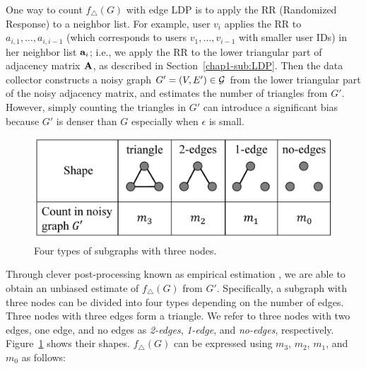 One way to count $f_\triangle(G)$ with edge LDP is 
to apply the RR (Randomized Response) 
to a neighbor list. 
For example, user $v_i$ applies the RR to 
$a_{i,1}, \ldots, a_{i,i-1}$ (which corresponds to users $v_1, \ldots, v_{i-1}$ with smaller user IDs) in her neighbor list $\mathbf{a}_i$; i.e., 
we apply the RR to the lower triangular part of adjacency matrix $\mathbf{A}$, as described in Section~\ref{chap1-sub:LDP}. 
Then the data collector constructs a noisy graph $G'=(V,E') \in \mathcal{G}$ from the lower triangular part of the noisy adjacency matrix, and 
estimates the number of triangles 
from $G'$. 
However, 
simply counting
the triangles in 
$G'$ 
can introduce a significant bias 
because $G'$ is denser than $G$ especially when $\epsilon$ is small. 

\begin{figure}
\centering
\includegraphics[width=0.9\linewidth]{fig/triplet_shape.pdf}
\vspace{-4mm}
\caption{Four types of subgraphs with three nodes.}
\label{chap1-fig:triplet_shape}
\end{figure}

Through 
clever post-processing 
known as 
empirical estimation 
\cite{Kairouz_ICML16,Murakami_USENIX19,Wang_USENIX17},
we are able to obtain an unbiased estimate of $f_\triangle(G)$ 
from $G'$. 
Specifically, a subgraph with three nodes can be divided into four types depending on the number of edges. 
Three nodes with three edges form a triangle. 
We refer to three nodes with two edges, one edge, and no edges as \textit{2-edges},  \textit{1-edge}, and  \textit{no-edges}, respectively. 
Figure~\ref{chap1-fig:triplet_shape} shows their shapes. 
$f_\triangle(G)$ can be expressed using $m_3$, $m_2$, $m_1$, and $m_0$ as follows:


